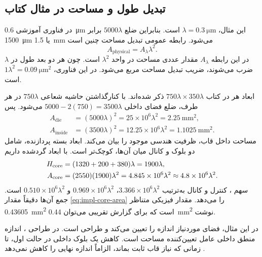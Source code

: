 \subsection{تبدیل طول و مساحت در مثال کتاب}
در فناوری آموزشی \qty{0.6}{\micro\metre} این مثال، \(\lambda=\qty{0.3}{\micro\metre}\)
است. بنابراین ضلع \(5000\lambda\) برابر \qty{1500}{\micro\metre} یا
\qty{1.5}{\milli\metre} می‌شود. رابطه عمومی تبدیل مساحت چنین است
\begin{equation}
 A_{\mathrm{physical}}=A_{\lambda}\lambda^2.
 \label{eq:impl-area-conversion}
\end{equation}
در این رابطه \(A_{\lambda}\) مقدار عددی مساحت در واحد \(\lambda^2\) است.
چون هر دو بعد طول در \(\lambda\) ضرب می‌شوند، ضریب تبدیل مساحت مربع می‌شود.
در این فناوری، \(1\lambda^2=\qty{0.09}{\micro\metre\squared}\) است.

ابعاد هر  در کتاب \(750\lambda\times350\lambda\) ذکر شده‌اند.
با کنارگذاشتن حاشیه شعاعی \(750\lambda\) در هر طرف، ضلع فضای داخلی
\(5000-2(750)=3500\lambda\) می‌شود. پس
\begin{align*}
 A_{\mathrm{die}}&=(5000\lambda)^2
 =25\times10^6\lambda^2=\qty{2.25}{\milli\metre\squared},\\
 A_{\mathrm{inside}}&=(3500\lambda)^2
 =12.25\times10^6\lambda^2=\qty{1.1025}{\milli\metre\squared}.
\end{align*}
مساحت داخل قاب، ظرفیت هندسی موجود را بیان می‌کند. ابعاد بسته پردازنده، شامل دو
بلوک و کانال میان آن‌ها، کوچک‌تر است. با ابعاد گرد‌شده  داریم
\begin{align}
 H_{\mathrm{core}}&=(1320+200+380)\lambda=1900\lambda,\notag\\
 A_{\mathrm{core}}&=(2550)(1900)\lambda^2
 =4.845\times10^6\lambda^2\approx4.8\times10^6\lambda^2.
 \label{eq:impl-core-area}
\end{align}
سهم ، کنترل و کانال به‌ترتیب
\(3.366\times10^6\lambda^2\)، \(0.969\times10^6\lambda^2\) و
\(0.510\times10^6\lambda^2\) است. جمع آن‌ها دقیقاً مقدار
\eqref{eq:impl-core-area} را می‌دهد. مقدار فیزیکی متناظر \qty{0.43605}{\milli\metre\squared}
است که برای گزارش تقریبی می‌توان \qty{0.44}{\milli\metre\squared} نوشت.

در این مثال، فضای موردنیاز  اندازه  را تعیین می‌کند و طراحی
 است. در طراحی ، اندازه منطق داخلی عامل تعیین‌کننده
مساحت است. کاهش یک بلوک داخلی در حالت اول، تا زمانی که نیاز قاب ثابت بماند،
الزاماً اندازه نهایی  را کاهش نمی‌دهد \cite[صفحه ۴۷]{weste}.


